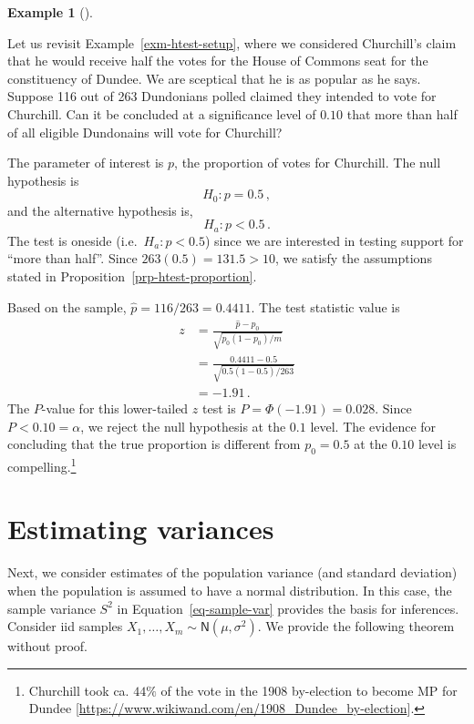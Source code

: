 \documentclass[
  a4paper,
  DIV=11,
  numbers=noendperiod,
  oneside]{scrreprt}
\theoremstyle{definition}
\theoremstyle{definition}
\theoremstyle{plain}
\theoremstyle{plain}
\theoremstyle{definition}
\newtheorem{example}{Example}[chapter]
\theoremstyle{remark}
\begin{document}
\begin{example}[]\protect\hypertarget{exm-est-prop-hypothesis-test}{}\label{exm-est-prop-hypothesis-test}

Let us revisit Example~\ref{exm-htest-setup}, where we considered
Churchill's claim that he would receive half the votes for the House of
Commons seat for the constituency of Dundee. We are sceptical that he is
as popular as he says. Suppose 116 out of 263 Dundonians polled claimed
they intended to vote for Churchill. Can it be concluded at a
significance level of \(0.10\) that more than half of all eligible
Dundonains will vote for Churchill?

The parameter of interest is \(p\), the proportion of votes for
Churchill. The null hypothesis is \[H_0 : p = 0.5\,,\] and the
alternative hypothesis is, \[H_a : p < 0.5\,.\] The test is oneside
(i.e.~\(H_a : p < 0.5\)) since we are interested in testing support for
``more than half''. Since \(263(0.5) = 131.5 > 10\), we satisfy the
assumptions stated in Proposition~\ref{prp-htest-proportion}.

Based on the sample, \(\widehat{p} = 116 / 263 = 0.4411.\) The test
statistic value is \[
\begin{aligned}
 z &= \frac{\widehat{p} - p_0}{\sqrt{p_0 (1-p_0) / m}} \\
 &= \frac{0.4411 - 0.5}{\sqrt{0.5 (1-0.5) / 263}}\\
 &= -1.91  \,.
\end{aligned}
\] The \(P\)-value for this lower-tailed \(z\) test is
\(P = \Phi(-1.91) = 0.028.\) Since \(P < 0.10 = \alpha\), we reject the
null hypothesis at the \(0.1\) level. The evidence for concluding that
the true proportion is different from \(p_0 = 0.5\) at the \(0.10\)
level is compelling.\footnote{Churchill took ca. \(44\%\) of the vote in
  the 1908 by-election to become MP for Dundee
  {[}\url{https://www.wikiwand.com/en/1908_Dundee_by-election}{]}.}

\end{example}

\section{Estimating variances}\label{sec-estimating-variances}

Next, we consider estimates of the population variance (and standard
deviation) when the population is assumed to have a normal distribution.
In this case, the sample variance \(S^2\) in
Equation~\ref{eq-sample-var} provides the basis for inferences. Consider
iid samples \(X_1, \dots, X_m \sim \mathsf{N}(\mu, \sigma^2).\) We
provide the following theorem without proof.
\end{document}
